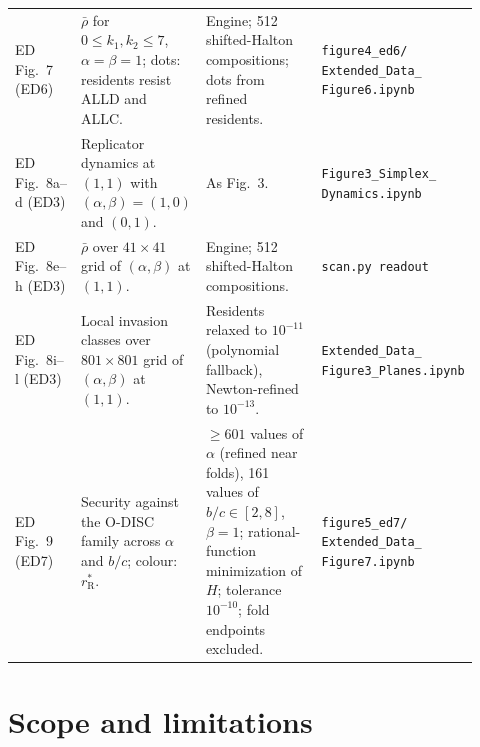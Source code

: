 \documentclass[fleqn,10pt]{article}
\theoremstyle{plain}
\theoremstyle{remark}
\newcommand{\FigStrategy}{3}
\newcommand{\EDDepth}{7}
\newcommand{\EDReadout}{8}
\newcommand{\EDSecurity}{9}
\newcommand{\rR}{r^*_{\mathrm R}}
\begin{document}
{\begin{longtable}{@{}>{\raggedright\arraybackslash}p{0.12\linewidth}>{\raggedright\arraybackslash}p{0.24\linewidth}>{\raggedright\arraybackslash}p{0.32\linewidth}>{\raggedright\arraybackslash}p{0.24\linewidth}@{}}
ED Fig.~\EDDepth{} (ED6) & $\bar\rho$ for $0\le k_1,k_2\le7$, $\alpha=\beta=1$; dots: residents resist ALLD and ALLC. & Engine; 512 shifted-Halton compositions; dots from refined residents. & \texttt{figure4\_ed6/ Extended\_Data\_ Figure6.ipynb}\\
ED Fig.~\EDReadout a--d (ED3) & Replicator dynamics at $(1,1)$ with $(\alpha,\beta)=(1,0)$ and $(0,1)$. & As Fig.~\FigStrategy. & \texttt{Figure3\_Simplex\_ Dynamics.ipynb}\\
ED Fig.~\EDReadout e--h (ED3) & $\bar\rho$ over $41\times41$ grid of $(\alpha,\beta)$ at $(1,1)$. & Engine; 512 shifted-Halton compositions. & \texttt{scan.py readout}\\
ED Fig.~\EDReadout i--l (ED3) & Local invasion classes over $801\times801$ grid of $(\alpha,\beta)$ at $(1,1)$. & Residents relaxed to $10^{-11}$ (polynomial fallback), Newton-refined to $10^{-13}$. & \texttt{Extended\_Data\_ Figure3\_Planes.ipynb}\\
ED Fig.~\EDSecurity{} (ED7) & Security against the O-DISC family across $\alpha$ and $b/c$; colour: $\rR$. & $\ge601$ values of $\alpha$ (refined near folds), 161 values of $b/c\in[2,8]$, $\beta=1$; rational-function minimization of $H$; tolerance $10^{-10}$; fold endpoints excluded. & \texttt{figure5\_ed7/ Extended\_Data\_ Figure7.ipynb}\\
\end{longtable}
}

\section{Scope and limitations}
\label{sec:limits}
\end{document}

